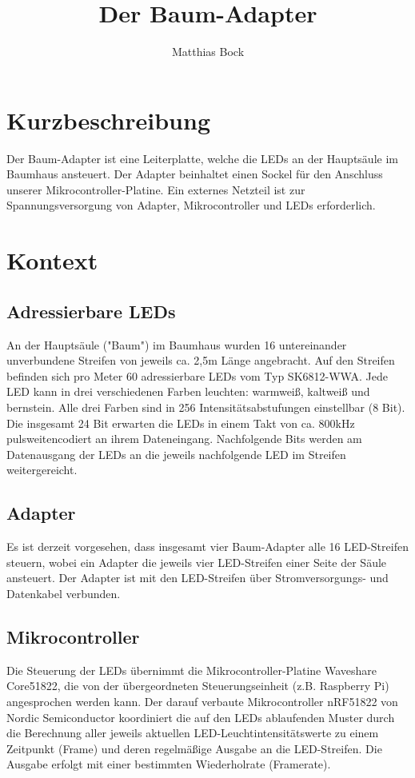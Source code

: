 \documentclass[a4paper,11pt]{article}
\title{Der Baum-Adapter}
\author{Matthias Bock}
\begin{document}
\maketitle

\section{Kurzbeschreibung}

Der Baum-Adapter ist eine Leiterplatte,
welche die LEDs an der Haupts\"aule im Baumhaus ansteuert.
Der Adapter beinhaltet einen Sockel
f\"ur den Anschluss unserer Mikrocontroller-Platine.
Ein externes Netzteil ist zur Spannungsversorgung
von Adapter, Mikrocontroller und LEDs erforderlich.

\newpage
\section{Kontext}

\subsection{Adressierbare LEDs}
An der Haupts\"aule ("Baum") im Baumhaus wurden
16 untereinander unverbundene Streifen
von jeweils ca. 2,5m L\"ange angebracht.
Auf den Streifen befinden sich pro Meter
60 adressierbare LEDs vom Typ SK6812-WWA.
Jede LED kann in drei verschiedenen Farben leuchten:
warmwei{\ss}, kaltwei{\ss} und bernstein.
Alle drei Farben sind in 256 Intensit\"atsabstufungen einstellbar (8 Bit).
Die insgesamt 24 Bit erwarten die LEDs
in einem Takt von ca. 800kHz
pulsweitencodiert
an ihrem Dateneingang.
Nachfolgende Bits werden am Datenausgang der LEDs
an die jeweils nachfolgende LED im Streifen weitergereicht.

\subsection{Adapter}
Es ist derzeit vorgesehen,
dass insgesamt vier Baum-Adapter
alle 16 LED-Streifen steuern,
wobei ein Adapter die jeweils vier LED-Streifen
einer Seite der S\"aule ansteuert.
Der Adapter ist mit den LED-Streifen
\"uber Stromversorgungs- und Datenkabel verbunden.

\subsection{Mikrocontroller}
Die Steuerung der LEDs \"ubernimmt die
Mikrocontroller-Platine Waveshare Core51822,
die von der \"ubergeordneten Steuerungseinheit
(z.B. Raspberry Pi)
angesprochen werden kann.
Der darauf verbaute Mikrocontroller nRF51822 von Nordic Semiconductor koordiniert die auf den LEDs ablaufenden Muster
durch die Berechnung aller jeweils aktuellen
LED-Leuchtintensit\"atswerte zu einem Zeitpunkt (Frame)
und deren regelm\"a{\ss}ige Ausgabe an die LED-Streifen.
Die Ausgabe erfolgt
mit einer bestimmten Wiederholrate (Framerate).
\end{document}
